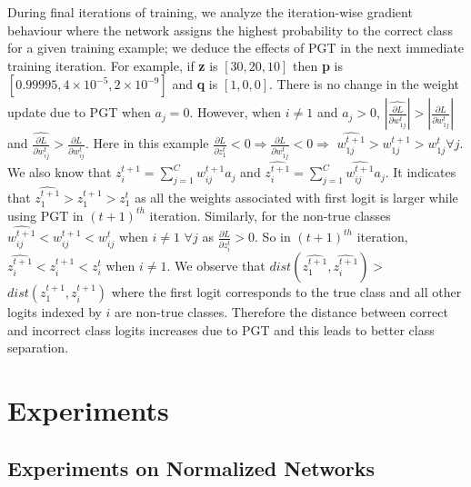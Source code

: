 \documentclass[times,sort&compress]{elsarticle}
\begin{document}
During final iterations of training, we analyze the iteration-wise gradient behaviour
where the network assigns the highest probability to the correct class for a given
training example; we deduce the effects of PGT in the next immediate training iteration.
For example, if \textbf{z} is $[30, 20, 10]$ then \textbf{p} is $[0.99995, 4\times
10^{-5}, 2\times10^{-9}]$ and \textbf{q} is $[1, 0, 0]$. There is no change in the
weight update due to PGT when $a_j = 0$. However, when $i \neq 1$ and $a_j > 0$,
$|\widehat{\frac{\partial L}{\partial w_{1j}^{t}}}| > |\frac{\partial L}{\partial
w_{1j}^{t}}|$ and $\widehat{\frac{\partial L}{\partial w_{ij}^{t}}} > \frac{\partial
L}{\partial w_{ij}^{t}}$. Here in this example $\frac{\partial L}{\partial z_{1}^{t}} <
0 \Rightarrow \frac{\partial L}{\partial w_{1j}^{t}} < 0 \Rightarrow$
$\widehat{w_{1j}^{t+1}} > w_{1j}^{t+1} > w_{1j}^{t} \forall j$. We also know that
$z_i^{t+1} = \sum_{j=1}^{C}w_{ij}^{t+1}a_j$ and $\widehat{z_i^{t+1}} =
\sum_{j=1}^{C}\widehat{w_{ij}^{t+1}}a_j$. It indicates that $\widehat{z_{1}^{t+1}} >
z_{1}^{t+1} > z_{1}^{t}$ as all the weights associated with first logit is larger while
using PGT in $(t+1)^{th}$ iteration. Similarly, for the non-true classes
$\widehat{w_{ij}^{t+1}} < w_{ij}^{t+1} < w_{ij}^{t}$ when $i \neq 1$ $\forall j$ as
$\frac{\partial L}{\partial z_{i}^{t}} > 0$. So in $(t+1)^{th}$ iteration,
$\widehat{z_{i}^{t+1}} < z_{i}^{t+1} < z_{i}^{t}$ when $i \neq 1$. We observe that
$dist(\widehat{z_{1}^{t+1}}, \widehat{z_{i}^{t+1}}) > $  $dist(z_{1}^{t+1},
z_{i}^{t+1})$ where the first logit corresponds to the true class and all other logits
indexed by $i$ are non-true classes. Therefore the distance between correct and
incorrect class logits increases due to PGT and this leads to better class separation.


\section{Experiments}
\label{sec:Expe}






\subsection{Experiments on Normalized Networks}
\label{sec:bn}
\end{document}
